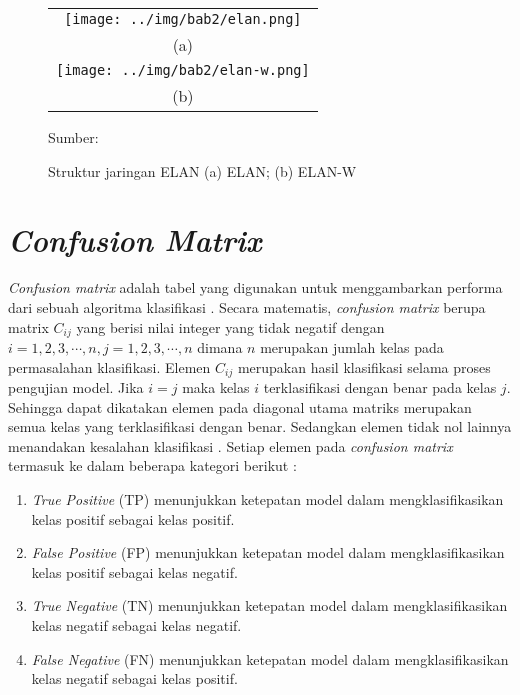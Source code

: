     \begin{figure}[H]
        \centering
        \begin{tabular}{c}
            \texttt{[image: ../img/bab2/elan.png]}\\
            (a)\\
            \texttt{[image: ../img/bab2/elan-w.png]}\\
            (b)\\
        \end{tabular}
        \caption{Struktur jaringan ELAN (a) ELAN; (b) ELAN-W}
        \label{fig:elan}
        Sumber: \citep{Wang2022}
    \end{figure}

\section{\textit{Confusion Matrix}}
\textit{Confusion matrix} adalah tabel yang digunakan untuk menggambarkan performa dari sebuah algoritma klasifikasi \citep{nasution2022sentiment, julianto2021performance}. Secara matematis, \textit{confusion matrix} berupa matrix $C_{ij}$ yang berisi nilai integer yang tidak negatif dengan $i=1, 2, 3, \cdots, n,j=1, 2, 3, \cdots, n$ dimana $n$ merupakan jumlah kelas pada permasalahan klasifikasi. Elemen $C_{ij}$ merupakan hasil klasifikasi selama proses pengujian model. Jika $i=j$ maka kelas $i$ terklasifikasi dengan benar pada kelas $j$. Sehingga dapat dikatakan elemen pada diagonal utama matriks merupakan semua kelas yang terklasifikasi dengan benar. Sedangkan elemen tidak nol lainnya menandakan kesalahan klasifikasi \citep{Susmaga2004}. Setiap elemen pada \textit{confusion matrix} termasuk ke dalam beberapa kategori berikut \citep{Shultz2017}:
\begin{enumerate}
    \item \textit{True Positive} (TP) menunjukkan ketepatan model dalam mengklasifikasikan kelas positif sebagai kelas positif.
    \item \textit{False Positive} (FP) menunjukkan ketepatan model dalam mengklasifikasikan kelas positif sebagai kelas negatif.
    \item \textit{True Negative} (TN) menunjukkan ketepatan model dalam mengklasifikasikan kelas negatif sebagai kelas negatif.
    \item \textit{False Negative} (FN) menunjukkan ketepatan model dalam mengklasifikasikan kelas negatif sebagai kelas positif.
\end{enumerate}

